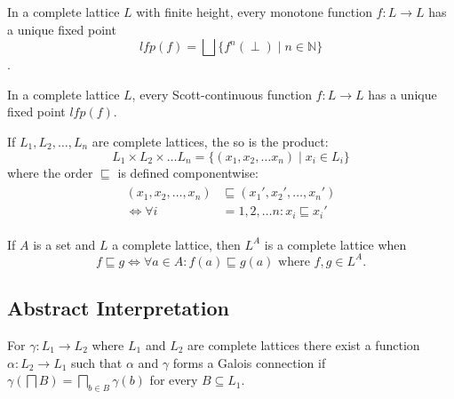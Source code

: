 \begin{theorem}\label{thm:kleene_finite}
    In a complete lattice $L$ with finite height, every monotone function $f : L \rightarrow L$ has a unique fixed point
    \begin{equation*}
        lfp(f) = \bigsqcup\{f^n(\perp) \mid n \in \mathbb{N}\}
    \end{equation*}.
\end{theorem}

\begin{theorem}\label{thm:kleene_scott}
    In a complete lattice $L$, every Scott-continuous function $f : L \rightarrow L$ has a unique fixed point $lfp(f)$.
\end{theorem}

\begin{theorem}
    If $L_1, L_2, \dots, L_n$ are complete lattices, the so is the product:
    \begin{equation*}
        L_1 \times L_2 \times \dots L_n = \{(x_1, x_2, \dots x_n) \mid x_i \in L_i\}
    \end{equation*}
    where the order $\sqsubseteq$ is defined componentwise:
    \begin{align*}
        \begin{split}
        (x_1, x_2, \dots, x_n) &\sqsubseteq (x_1', x_2', \dots, x_n') \\
        \iff
        \forall i &= 1, 2, \dots n : x_i \sqsubseteq x_i'
        \end{split}
    \end{align*}
\end{theorem}

\begin{theorem}
    If $A$ is a set and $L$ a complete lattice, then $L^A$ is a complete lattice when
    \begin{equation}
        f \sqsubseteq g \iff \forall a \in A : f(a) \sqsubseteq g(a) \text{ where } f,g \in L^A.
    \end{equation}

\end{theorem}


\subsection{Abstract Interpretation}

\begin{theorem}\label{thm:galoispre}
    For $\gamma : L_1 \rightarrow L_2$ where $L_1$ and $L_2$ are complete lattices there exist a function $\alpha : L_2 \rightarrow L_1$ such that $\alpha$ and $\gamma$ forms a Galois connection if $\gamma(\bigsqcap B) = \bigsqcap_{b \in B}\gamma(b)$ for every $B \subseteq L_1$.
\end{theorem}

